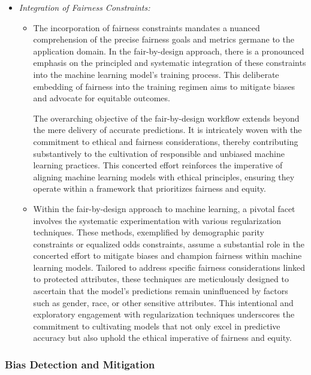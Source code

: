 \documentclass[12pt,a4paper,openright,twoside]{book}
\begin{document}
\begin{itemize}

    \item \emph{Integration of Fairness Constraints:}

    \begin{itemize}

        \item The incorporation of fairness constraints mandates a nuanced comprehension of the precise fairness goals and metrics germane to the application domain. In the fair-by-design approach, there is a pronounced emphasis on the principled and systematic integration of these constraints into the machine learning model's training process. This deliberate embedding of fairness into the training regimen aims to mitigate biases and advocate for equitable outcomes.

        The overarching objective of the fair-by-design workflow extends beyond the mere delivery of accurate predictions. It is intricately woven with the commitment to ethical and fairness considerations, thereby contributing substantively to the cultivation of responsible and unbiased machine learning practices. This concerted effort reinforces the imperative of aligning machine learning models with ethical principles, ensuring they operate within a framework that prioritizes fairness and equity.

        \item Within the fair-by-design approach to machine learning, a pivotal facet involves the systematic experimentation with various regularization techniques. These methods, exemplified by demographic parity constraints or equalized odds constraints, assume a substantial role in the concerted effort to mitigate biases and champion fairness within machine learning models. Tailored to address specific fairness considerations linked to protected attributes, these techniques are meticulously designed to ascertain that the model's predictions remain uninfluenced by factors such as gender, race, or other sensitive attributes. This intentional and exploratory engagement with regularization techniques underscores the commitment to cultivating models that not only excel in predictive accuracy but also uphold the ethical imperative of fairness and equity.
    
    \end{itemize}

\end{itemize}

\subsubsection{Bias Detection and Mitigation}
\end{document}

